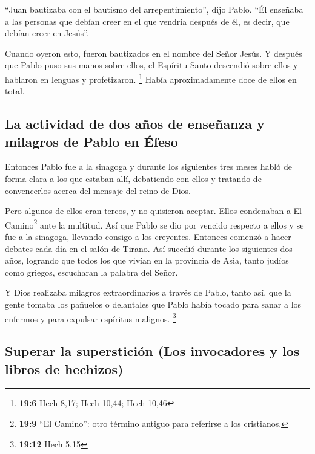  ``Juan bautizaba con el bautismo del arrepentimiento'',
dijo Pablo. ``Él enseñaba a las personas que debían creer en el que
vendría después de él, es decir, que debían creer en Jesús''.

 Cuando oyeron esto, fueron bautizados en el nombre del
Señor Jesús.  Y después que Pablo puso sus manos sobre
ellos, el Espíritu Santo descendió sobre ellos y hablaron en lenguas y
profetizaron. \footnote{\textbf{19:6} Hech 8,17; Hech 10,44; Hech 10,46}
 Había aproximadamente doce de ellos en total.

\hypertarget{la-actividad-de-dos-auxf1os-de-enseuxf1anza-y-milagros-de-pablo-en-uxe9feso}{%
\subsection{La actividad de dos años de enseñanza y milagros de Pablo en
Éfeso}\label{la-actividad-de-dos-auxf1os-de-enseuxf1anza-y-milagros-de-pablo-en-uxe9feso}}

 Entonces Pablo fue a la sinagoga y durante los siguientes
tres meses habló de forma clara a los que estaban allí, debatiendo con
ellos y tratando de convencerlos acerca del mensaje del reino de Dios.

 Pero algunos de ellos eran tercos, y no quisieron
aceptar. Ellos condenaban a El Camino\footnote{\textbf{19:9} ``El
  Camino'': otro término antiguo para referirse a los cristianos.} ante
la multitud. Así que Pablo se dio por vencido respecto a ellos y se fue
a la sinagoga, llevando consigo a los creyentes. Entonces comenzó a
hacer debates cada día en el salón de Tirano.  Así
sucedió durante los siguientes dos años, logrando que todos los que
vivían en la provincia de Asia, tanto judíos como griegos, escucharan la
palabra del Señor.

 Y Dios realizaba milagros extraordinarios a través de
Pablo,  tanto así, que la gente tomaba los pañuelos o
delantales que Pablo había tocado para sanar a los enfermos y para
expulsar espíritus malignos. \footnote{\textbf{19:12} Hech 5,15}

\hypertarget{superar-la-supersticiuxf3n-los-invocadores-y-los-libros-de-hechizos}{%
\subsection{Superar la superstición (Los invocadores y los libros de
hechizos)}\label{superar-la-supersticiuxf3n-los-invocadores-y-los-libros-de-hechizos}}

